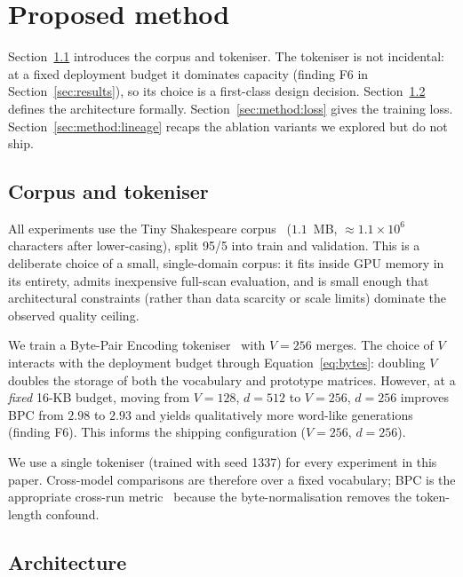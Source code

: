 \documentclass[runningheads]{llncs}
\begin{document}

\section{Proposed method}
\label{sec:method}

Section~\ref{sec:method:data} introduces the corpus and tokeniser. The
tokeniser is not incidental: at a fixed deployment budget it dominates
capacity (finding F6 in Section~\ref{sec:results}), so its choice is a
first-class design decision. Section~\ref{sec:method:arch} defines the
architecture formally. Section~\ref{sec:method:loss} gives the training
loss. Section~\ref{sec:method:lineage} recaps the ablation variants we
explored but do not ship.

\subsection{Corpus and tokeniser}
\label{sec:method:data}

All experiments use the Tiny Shakespeare
corpus~\cite{karpathy2015tinyshakespeare} ($1.1$~MB, ${\approx}1.1{\times}10^6$
characters after lower-casing), split 95/5 into train and validation. This
is a deliberate choice of a small, single-domain corpus: it fits inside
GPU memory in its entirety, admits inexpensive full-scan evaluation, and
is small enough that architectural constraints (rather than data scarcity
or scale limits) dominate the observed quality ceiling.

We train a Byte-Pair Encoding tokeniser~\cite{sennrich2016bpe} with
$V=256$ merges. The choice of $V$ interacts with the deployment budget
through Equation~\ref{eq:bytes}: doubling $V$ doubles the storage of both
the vocabulary and prototype matrices. However, at a \emph{fixed} 16-KB
budget, moving from $V{=}128$, $d{=}512$ to $V{=}256$, $d{=}256$ improves
BPC from $2.98$ to $2.93$ and yields qualitatively more word-like
generations (finding F6). This informs the shipping configuration
($V{=}256$, $d{=}256$).

We use a single tokeniser (trained with seed 1337) for every experiment
in this paper. Cross-model comparisons are therefore over a fixed vocabulary;
BPC is the appropriate cross-run metric~\cite{peng2023rwkv} because the
byte-normalisation removes the token-length confound.

\subsection{Architecture}
\label{sec:method:arch}
\end{document}
